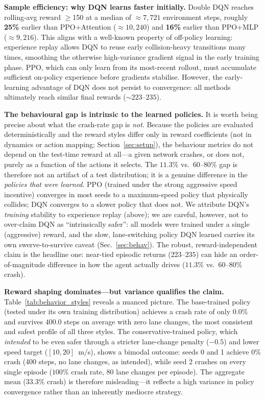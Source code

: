 \documentclass[conference]{IEEEtran}
\begin{document}
\textbf{Sample efficiency: why DQN learns faster initially.} Double DQN reaches
rolling-avg reward $\geq$150 at a median of ${\approx}7{,}721$ environment steps,
roughly \textbf{25\%} earlier than PPO+Attention (${\approx}10{,}240$) and
\textbf{16\%} earlier than PPO+MLP (${\approx}9{,}216$). This aligns with
a well-known property of off-policy learning: experience replay allows DQN to
reuse early collision-heavy transitions many times, smoothing the otherwise
high-variance gradient signal in the early training phase. PPO, which can only
learn from its most-recent rollout, must accumulate sufficient on-policy
experience before gradients stabilise. However, the early-learning advantage of
DQN does not persist to convergence: all methods ultimately reach similar final
rewards (${\sim}223$--$235$).

\textbf{The behavioural gap is intrinsic to the learned policies.} It is worth
being precise about what the crash-rate gap is \emph{not}. Because the policies
are evaluated deterministically and the reward styles differ only in reward
coefficients (not in dynamics or action mapping; Section~\ref{sec:setup}), the
behaviour metrics do not depend on the test-time reward at all---a given network
crashes, or does not, purely as a function of the actions it selects. The
$11.3\%$ vs.\ $60$--$80\%$ gap is therefore not an artifact of a test
distribution; it is a genuine difference in the \emph{policies that were
learned}. PPO (trained under the strong aggressive speed incentive) converges in
most seeds to a maximum-speed policy that physically collides; DQN converges to a
slower policy that does not. We attribute DQN's \emph{training} stability to
experience replay (above); we are careful, however, not to over-claim DQN as
``intrinsically safer'': all models were trained under a single (aggressive)
reward, and the slow, lane-switching policy DQN learned carries its own
swerve-to-survive caveat (Sec.~\ref{sec:behav}). The robust, reward-independent
claim is the headline one: near-tied episodic returns ($223$--$235$) can hide an
order-of-magnitude difference in how the agent actually drives
($11.3\%$ vs.\ $60$--$80\%$ crash).

\textbf{Reward shaping dominates---but variance qualifies the claim.}
Table~\ref{tab:behavior_styles} reveals a nuanced picture. The base-trained
policy (tested under its own training distribution) achieves a crash rate of
only $0.0\%$ and survives $400.0$ steps on average with zero lane changes,
the most consistent and safest profile of all three styles. The
conservative-trained policy, which \emph{intended} to be even safer through a
stricter lane-change penalty ($-0.5$) and lower speed target ($[10,20]$~m/s),
shows a bimodal outcome: seeds 0 and 1 achieve $0\%$ crash (400 steps, no lane
changes, as intended), while seed 2 crashes on every single episode
($100\%$ crash rate, 80 lane changes per episode). The aggregate mean ($33.3\%$
crash) is therefore misleading---it reflects a high variance in policy
convergence rather than an inherently mediocre strategy.
\end{document}
